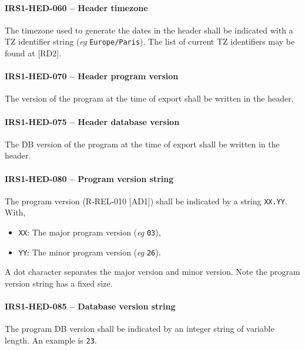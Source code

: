 \paragraph{IRS1-HED-060 -- Header timezone}
The timezone used to generate the dates in the header shall be indicated
with a TZ identifier string (\textit{eg} \lstinline{Europe/Paris}).
The list of current TZ identifiers may be found at [RD2].

\paragraph{IRS1-HED-070 -- Header program version}
The version of the program at the time of export shall be written
in the header.

\paragraph{IRS1-HED-075 -- Header database version}
The \gls{DB} version of the program at the time of export shall
be written in the header.

\paragraph{IRS1-HED-080 -- Program version string}
The program version (R-REL-010 [AD1]) shall be indicated by a string
\lstinline{XX.YY}. With,
\begin{itemize}
\item \lstinline{XX}: The major program version (\textit{eg} \lstinline{03}),
\item \lstinline{YY}: The minor program version (\textit{eg} \lstinline{26}).
\end{itemize}

A dot character separates the major version and minor version.
Note the program version string has a fixed size.

\paragraph{IRS1-HED-085 -- Database version string}
The program \gls{DB} version shall be indicated by an integer string
of variable length. An example is \lstinline{23}.

